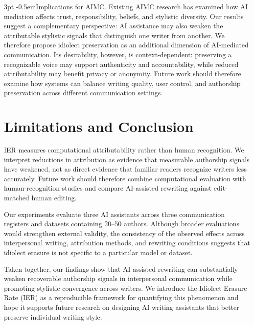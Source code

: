 \documentclass[sigconf,nonacm]{acmart}
\makeatletter
\renewcommand\paragraph{\@startsection{paragraph}{4}{\z@}%
  {3pt \@plus 1pt \@minus 1pt}{-0.5em}{\normalfont\normalsize\bfseries}}
\makeatother
\begin{document}
\paragraph{Implications for AIMC.}
Existing AIMC research has examined how AI mediation affects trust, responsibility,
beliefs, and stylistic diversity. Our results suggest a complementary perspective: AI
assistance may also weaken the attributable stylistic signals that distinguish one
writer from another. We therefore propose idiolect preservation as an additional
dimension of AI-mediated communication. Its desirability, however, is
context-dependent: preserving a recognizable voice may support authenticity and
accountability, while reduced attributability may benefit privacy or anonymity.
Future work should therefore examine how systems can balance writing quality, user
control, and authorship preservation across different communication settings.

\section{Limitations and Conclusion}

IER measures computational attributability rather than human recognition. We
interpret reductions in attribution as evidence that measurable authorship signals
have weakened, not as direct evidence that familiar readers recognize writers less
accurately. Future work should therefore combine computational evaluation with
human-recognition studies and compare AI-assisted rewriting against edit-matched
human editing.

Our experiments evaluate three AI assistants across three communication registers
and datasets containing 20--50 authors. Although broader evaluations would
strengthen external validity, the consistency of the observed effects across
interpersonal writing, attribution methods, and rewriting conditions suggests that
idiolect erasure is not specific to a particular model or dataset.

Taken together, our findings show that AI-assisted rewriting can substantially
weaken recoverable authorship signals in interpersonal communication while promoting
stylistic convergence across writers. We introduce the Idiolect Erasure Rate (IER)
as a reproducible framework for quantifying this phenomenon and hope it supports
future research on designing AI writing assistants that better preserve individual
writing style.
\end{document}
